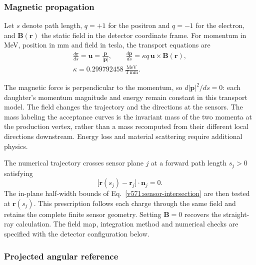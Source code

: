 \begin{samepage}
\subsubsection{Magnetic propagation}
\label{v571:magnetic-propagation}
Let $s$ denote path length, $q=+1$ for the positron and $q=-1$ for the
electron, and $\boldsymbol B(\boldsymbol r)$ the static field in the detector
coordinate frame. For momentum in MeV, position in mm and field in tesla,
the transport equations are
\begin{equation}
 \begin{gathered}
  \frac{d\boldsymbol r}{ds}=\boldsymbol u
      =\frac{\boldsymbol p}{|\boldsymbol p|},\qquad
  \frac{d\boldsymbol p}{ds}
      =\kappa q\,\boldsymbol u\times\boldsymbol B(\boldsymbol r),\\[3pt]
  \kappa=0.299792458\ \frac{\mathrm{MeV}}{\mathrm{T\,mm}}.
 \end{gathered}
  \label{v571:magnetic-equations}
\end{equation}
\end{samepage}
The magnetic force is perpendicular to the momentum, so
$d|\boldsymbol p|^2/ds=0$: each daughter's momentum magnitude and energy
remain constant in this transport model. The field changes the trajectory
and the directions at the sensors. The mass labeling the acceptance curves
is the invariant mass of the two momenta at the production vertex, rather
than a mass recomputed from their different local directions downstream.
Energy loss and material scattering require additional physics.

The numerical trajectory crosses sensor plane $j$ at a forward path length
$s_j>0$ satisfying
\begin{equation}
  \bigl[\boldsymbol r(s_j)-\boldsymbol r_j\bigr]\cdot
  \boldsymbol n_j=0.
  \label{v571:curved-crossing}
\end{equation}
The in-plane half-width bounds of Eq.~\eqref{v571:sensor-intersection}
are then tested at $\boldsymbol r(s_j)$. This prescription follows each
charge through the same field and retains the complete finite sensor
geometry. Setting $\boldsymbol B=0$ recovers the straight-ray calculation.
The field map, integration method and numerical checks are specified with
the detector configuration below.

\subsubsection{Projected angular reference}

